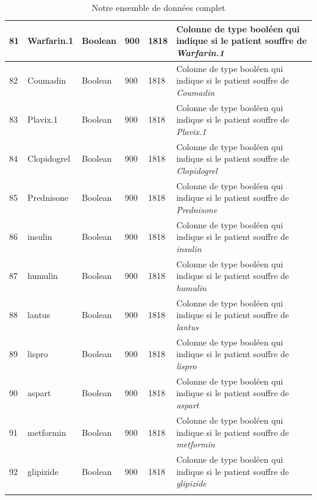 \documentclass[12pt, french]{report}
\begin{document}
\begin{longtable}{| p{} | p{} | p{} | p{}  | p{} | p{} |  }
81 &	Warfarin.1 & Boolean & 900 & 1818& Colonne de type booléen qui indique si le patient souffre  de \textit{Warfarin.1} \\ \hline 
82 &	Coumadin & Boolean & 900 & 1818& Colonne de type booléen qui indique si le patient souffre  de \textit{Coumadin} \\ \hline 
83 &	Plavix.1 & Boolean & 900 & 1818& Colonne de type booléen qui indique si le patient souffre  de \textit{Plavix.1} \\ \hline 
84 &	Clopidogrel & Boolean & 900 & 1818& Colonne de type booléen qui indique si le patient souffre  de \textit{Clopidogrel} \\ \hline 
85 &	Prednisone & Boolean & 900 & 1818& Colonne de type booléen qui indique si le patient souffre  de \textit{Prednisone} \\ \hline 
86 &	insulin & Boolean & 900 & 1818& Colonne de type booléen qui indique si le patient souffre  de \textit{insulin} \\ \hline 
87 &	humulin & Boolean & 900 & 1818& Colonne de type booléen qui indique si le patient souffre  de \textit{humulin} \\ \hline 
88 &	lantus & Boolean & 900 & 1818& Colonne de type booléen qui indique si le patient souffre  de \textit{lantus} \\ \hline 
89 &	lispro & Boolean & 900 & 1818& Colonne de type booléen qui indique si le patient souffre  de \textit{lispro} \\ \hline 
90 &	aspart & Boolean & 900 & 1818& Colonne de type booléen qui indique si le patient souffre  de \textit{aspart} \\ \hline 
91 &	metformin & Boolean & 900 & 1818& Colonne de type booléen qui indique si le patient souffre  de \textit{metformin} \\ \hline 
92 &	glipizide & Boolean & 900 & 1818& Colonne de type booléen qui indique si le patient souffre  de \textit{glipizide} \\ \hline



\caption{Notre ensemble de données complet}
\label{tab:dt}
\end{longtable}

\newpage
{}


 	
\end{document}
